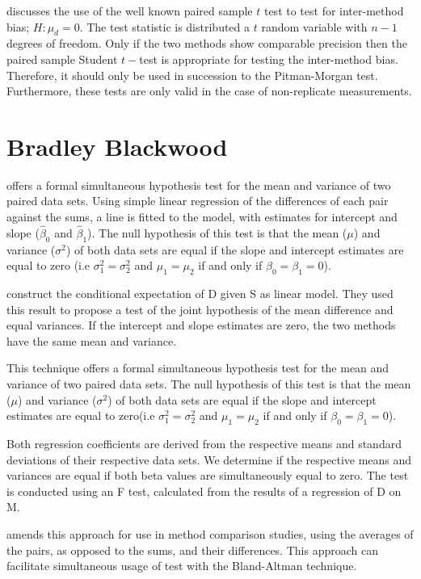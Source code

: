 \documentclass[12pt, a4paper]{report}
\theoremstyle{plain}
\theoremstyle{definition}
\theoremstyle{remark}
\begin{document}
\citet{Bartko} discusses the use of the well known paired sample $t$ test to test for inter-method bias; $H: \mu_{d}=0$. The test statistic is distributed a $t$ random variable with $n-1$ degrees of freedom. Only if the two methods show comparable precision then the paired sample Student $t-$test is appropriate for testing the inter-method bias. Therefore, it should only be used in succession to the Pitman-Morgan test. Furthermore, these tests are only valid in the case of non-replicate measurements.

\section{Bradley Blackwood}
\citet{BB89} offers a formal simultaneous hypothesis test for the mean and variance of two paired data sets. Using simple linear regression of the differences of each pair against the sums, a line is fitted to the model, with estimates for intercept and slope ($\hat{\beta}_{0}$ and $\hat{\beta}_{1}$). The null hypothesis of this test is that the mean ($\mu$) and variance
($\sigma^{2}$) of both data sets are equal if the slope and intercept estimates are equal to zero (i.e $\sigma^{2}_{1} = \sigma^{2}_{2}$ and $\mu_{1}=\mu_{2}$ if and only if $\beta_{0} = \beta_{1}=0$).

\citet{BB89} construct the conditional expectation of D given S as linear model. They used this result to propose a test of the joint hypothesis of the mean difference and equal variances. If the intercept and slope estimates are zero, the two methods have the same mean and variance.

This technique offers a formal simultaneous hypothesis test for the mean and variance of two paired data sets. The null hypothesis of this test is that the mean ($\mu$) and variance ($\sigma^{2}$) of both data sets are equal if the slope and intercept estimates are equal to zero(i.e $\sigma^{2}_{1} =
\sigma^{2}_{2}$ and $\mu_{1}=\mu_{2}$ if and only if $\beta_{0}=
\beta_{1}=0$).

Both regression coefficients are derived from the respective means and
standard deviations of their respective data sets. We determine if the respective means and variances are equal if both beta values are simultaneously equal to zero. The test is conducted using an F test, calculated from the results of a regression of D on M.

\citet{Bartko} amends this approach for use in method
comparison studies, using the averages of the pairs, as opposed to
the sums, and their differences. This approach can facilitate
simultaneous usage of test with the Bland-Altman technique.
\end{document}
